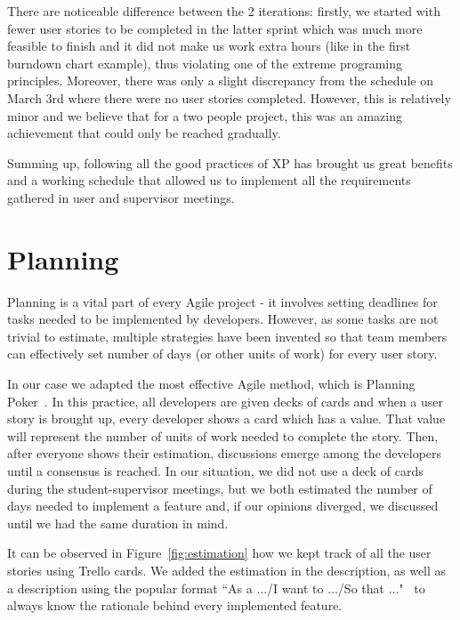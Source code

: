 \documentclass{l4proj}
\begin{document}
There are noticeable difference between the 2 iterations: firstly, we started with fewer user stories to be completed in the latter sprint which was much more feasible to finish and it did not make us work extra hours (like in the first burndown chart example), thus violating one of the extreme programing principles. Moreover, there was only a slight discrepancy from the schedule on March 3rd where there were no user stories completed. However, this is relatively minor and we believe that for a two people project, this was an amazing achievement that could only be reached gradually.

Summing up, following all the good practices of XP has brought us great benefits and a working schedule that allowed us to implement all the requirements gathered in user and supervisor meetings.

\section{Planning}

Planning is a vital part of every Agile project - it involves setting deadlines for tasks needed to be implemented by
developers. However, as some tasks are not trivial to estimate, multiple strategies have been invented so that team
members can effectively set number of days (or other units of work) for every user story.

In our case we adapted the most effective Agile method, which is
Planning Poker~\cite{planning-poker}. In this practice, all developers are given decks of cards and when a user story is brought up, every developer shows a card which has a value. That value will represent the number of units of work
needed to complete the story. Then, after everyone shows their estimation, discussions emerge among the developers until a consensus is reached. In our situation, we did not use a deck of cards during the student-supervisor meetings, but we both estimated the number of days needed to implement a feature and, if our opinions diverged, we discussed until we had the same duration in mind.

It can be observed in Figure~\ref{fig:estimation} how we kept track of all the user stories using Trello cards. We added the estimation in the
description, as well as a description using the popular format ``As a $\dots$/I want to $\dots$/So that $\dots$"~\cite{user-story-format} to always know the
rationale behind every implemented feature.

\pagebreak
\end{document}
